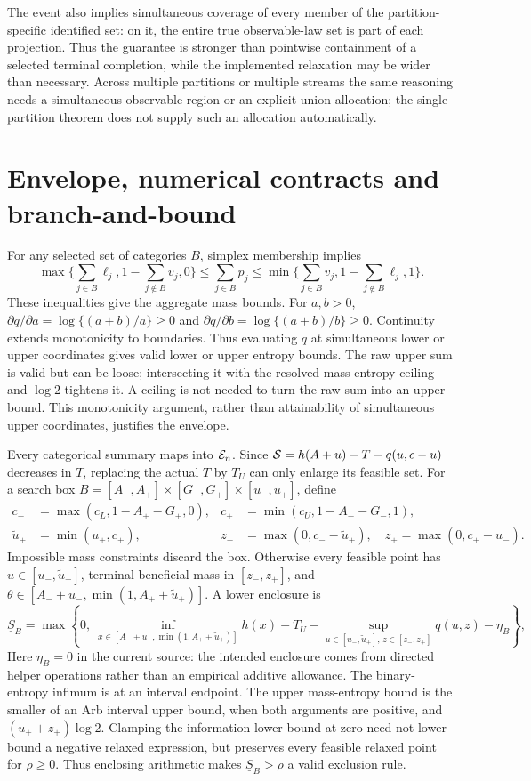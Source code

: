 The event also implies simultaneous coverage of every member of the partition-specific identified set: on it, the entire true observable-law set is part of each projection. Thus the guarantee is stronger than pointwise containment of a selected terminal completion, while the implemented relaxation may be wider than necessary. Across multiple partitions or multiple streams the same reasoning needs a simultaneous observable region or an explicit union allocation; the single-partition theorem does not supply such an allocation automatically.

\section{Envelope, numerical contracts and branch-and-bound}
For any selected set of categories $B$, simplex membership implies
\begin{equation}
 \max\{\sum_{j\in B}\ell_j,1-\sum_{j\notin B}v_j,0\}
 \le\sum_{j\in B}p_j\le
 \min\{\sum_{j\in B}v_j,1-\sum_{j\notin B}\ell_j,1\}.
\end{equation}
These inequalities give the aggregate mass bounds. For $a,b>0$, $\partial q/\partial a=\log\{(a+b)/a\}\ge0$ and $\partial q/\partial b=\log\{(a+b)/b\}\ge0$. Continuity extends monotonicity to boundaries. Thus evaluating $q$ at simultaneous lower or upper coordinates gives valid lower or upper entropy bounds. The raw upper sum is valid but can be loose; intersecting it with the resolved-mass entropy ceiling and $\log2$ tightens it. A ceiling is not needed to turn the raw sum into an upper bound. This monotonicity argument, rather than attainability of simultaneous upper coordinates, justifies the envelope.

Every categorical summary maps into $\mathcal E_n$. Since $\mathcal S=h(A+u)-T-q(u,c-u)$ decreases in $T$, replacing the actual $T$ by $T_U$ can only enlarge its feasible set. For a search box $B=[A_-,A_+]\times[G_-,G_+]\times[u_-,u_+]$, define
\begin{align}
 c_-&=\max(c_L,1-A_+-G_+,0),&c_+&=\min(c_U,1-A_--G_-,1),\\
 \tilde u_+&=\min(u_+,c_+),&
 z_-&=\max(0,c_--\tilde u_+),\quad z_+=\max(0,c_+-u_-).
\end{align}
Impossible mass constraints discard the box. Otherwise every feasible point has $u\in[u_-,\tilde u_+]$, terminal beneficial mass in $[z_-,z_+]$, and $\theta\in[A_-+u_-,\min(1,A_++\tilde u_+)]$. A lower enclosure is
\begin{equation}
 \underline S_B=\max\left\{0,\ \inf_{x\in[A_-+u_-,\min(1,A_++\tilde u_+)]}h(x)
       -T_U-\sup_{u\in[u_-,\tilde u_+],\,z\in[z_-,z_+]}q(u,z)-\eta_B\right\},
\end{equation}
Here $\eta_B=0$ in the current source: the intended enclosure comes from directed helper operations rather than an empirical additive allowance. The binary-entropy infimum is at an interval endpoint. The upper mass-entropy bound is the smaller of an Arb interval upper bound, when both arguments are positive, and $(u_++z_+)\log2$. Clamping the information lower bound at zero need not lower-bound a negative relaxed expression, but preserves every feasible relaxed point for $\rho\ge0$. Thus enclosing arithmetic makes $\underline S_B>\rho$ a valid exclusion rule.

